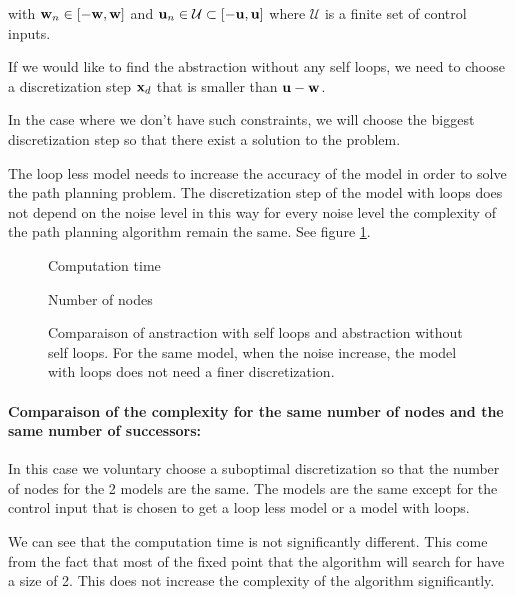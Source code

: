 with $ \mathbf{w}_n \in [- \mathbf{w}, \mathbf{w}]$ and $ \mathbf{u}_n \in \mathcal{U} \subset [- \mathbf{u}, \mathbf{u}]$ where $\mathcal{U}$ is a finite set of control inputs.

If we would like to find the abstraction without any self loops, we need to choose a discretization step $ \mathbf{x}_d$ that is smaller than $ \mathbf{u}- \mathbf{w}$.

In the case where we don't have such constraints, we will choose the biggest discretization step so that there exist a solution to the problem. 

The loop less model needs to increase the accuracy of the model in order to solve the path planning problem.
The discretization step of the model with loops does not depend on the noise level in this way for every noise level the complexity of the path planning algorithm remain the same.
See figure \ref{fig:comp_loops}.

\begin{figure}
    \centering
    \begin{minipage}[b]{0.49\textwidth}
        
        \caption{Computation time}
    \end{minipage}
    \begin{minipage}[b]{0.49\textwidth}
		        		\caption{Number of nodes}
    \end{minipage}
    \caption{Comparaison of anstraction with self loops and abstraction without self loops. For the same model, when the noise increase, the model with loops does not need a finer discretization.}
    \label{fig:comp_loops}
\end{figure}

\paragraph{Comparaison of the complexity for the same number of nodes and the same number of successors:}
In this case we voluntary choose a suboptimal discretization so that the number of nodes for the 2 models are the same.
The models are the same except for the control input that is chosen to get a loop less model or a model with loops.

We can see that the computation time is not significantly different.
This come from the fact that most of the fixed point that the algorithm will search for have a size of 2.
This does not increase the complexity of the algorithm significantly.

